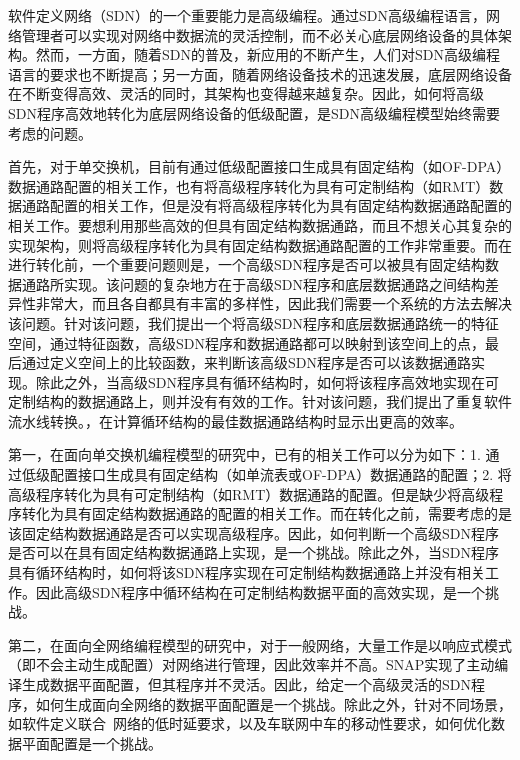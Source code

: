 \begin{cabstract}  

软件定义网络（SDN）的一个重要能力是高级编程。通过SDN高级编程语言，网络管理者可以实现对网络中数据流的灵活控制，而不必关心底层网络设备的具体架构。然而，一方面，随着SDN的普及，新应用的不断产生，人们对SDN高级编程语言的要求也不断提高；另一方面，随着网络设备技术的迅速发展，底层网络设备在不断变得高效、灵活的同时，其架构也变得越来越复杂。因此，如何将高级SDN程序高效地转化为底层网络设备的低级配置，是SDN高级编程模型始终需要考虑的问题。

首先，对于单交换机，目前有通过低级配置接口生成具有固定结构（如OF-DPA）数据通路配置的相关工作，也有将高级程序转化为具有可定制结构（如RMT）数据通路配置的相关工作，但是没有将高级程序转化为具有固定结构数据通路配置的相关工作。要想利用那些高效的但具有固定结构数据通路，而且不想关心其复杂的实现架构，则将高级程序转化为具有固定结构数据通路配置的工作非常重要。而在进行转化前，一个重要问题则是，一个高级SDN程序是否可以被具有固定结构数据通路所实现。该问题的复杂地方在于高级SDN程序和底层数据通路之间结构差异性非常大，而且各自都具有丰富的多样性，因此我们需要一个系统的方法去解决该问题。针对该问题，我们提出一个将高级SDN程序和底层数据通路统一的特征空间，通过特征函数，高级SDN程序和数据通路都可以映射到该空间上的点，最后通过定义空间上的比较函数，来判断该高级SDN程序是否可以该数据通路实现。除此之外，当高级SDN程序具有循环结构时，如何将该程序高效地实现在可定制结构的数据通路上，则并没有有效的工作。针对该问题，我们提出了重复软件流水线转换。，在计算循环结构的最佳数据通路结构时显示出更高的效率。


第一，在面向单交换机编程模型的研究中，已有的相关工作可以分为如下：1. 通过低级配置接口生成具有固定结构（如单流表或OF-DPA）数据通路的配置；2. 将高级程序转化为具有可定制结构（如RMT）数据通路的配置。但是缺少将高级程序转化为具有固定结构数据通路的配置的相关工作。而在转化之前，需要考虑的是该固定结构数据通路是否可以实现高级程序。因此，如何判断一个高级SDN程序是否可以在具有固定结构数据通路上实现，是一个挑战。除此之外，当SDN程序具有循环结构时，如何将该SDN程序实现在可定制结构数据通路上并没有相关工作。因此高级SDN程序中循环结构在可定制结构数据平面的高效实现，是一个挑战。

第二，在面向全网络编程模型的研究中，对于一般网络，大量工作是以响应式模式（即不会主动生成配置）对网络进行管理，因此效率并不高。SNAP实现了主动编译生成数据平面配置，但其程序并不灵活。因此，给定一个高级灵活的SDN程序，如何生成面向全网络的数据平面配置是一个挑战。除此之外，针对不同场景，如软件定义联合~\cite{mishra2017comparing}网络的低时延要求，以及车联网中车的移动性要求，如何优化数据平面配置是一个挑战。

\end{cabstract}


